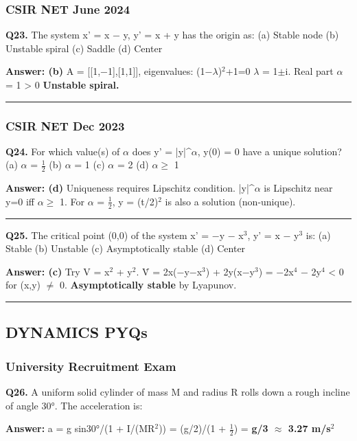 \documentclass[12pt,a4paper,openany]{book}
\begin{document}
{{\subsubsection{CSIR NET June 2024}
\textbf{Q23.} The system x' = x − y, y' = x + y has the origin as:
(a) Stable node  (b) Unstable spiral  (c) Saddle  (d) Center

\textbf{Answer: (b)} A = [[1,−1],[1,1]], eigenvalues: (1−$\lambda$)$^2$+1=0  $\lambda$ = 1$\pm$i. Real part $\alpha$ = 1 > 0  \textbf{Unstable spiral.}

\bigskip\noindent\rule{\textwidth}{0.4pt}\bigskip

\subsubsection{CSIR NET Dec 2023}
\textbf{Q24.} For which value(s) of $\alpha$ does y' = |y|^$\alpha$, y(0) = 0 have a unique solution?
(a) $\alpha$ = $\frac{1}{2}$  (b) $\alpha$ = 1  (c) $\alpha$ = 2  (d) $\alpha\geq$ 1

\textbf{Answer: (d)} Uniqueness requires Lipschitz condition. |y|^$\alpha$ is Lipschitz near y=0 iff $\alpha\geq$ 1. For $\alpha$ = $\frac{1}{2}$, y = (t/2)$^2$ is also a solution (non-unique).

\bigskip\noindent\rule{\textwidth}{0.4pt}\bigskip

\textbf{Q25.} The critical point (0,0) of the system x' = −y − x$^3$, y' = x − y$^3$ is:
(a) Stable  (b) Unstable  (c) Asymptotically stable  (d) Center

\textbf{Answer: (c)} Try V = x$^2$ + y$^2$. V̇ = 2x(−y−x$^3$) + 2y(x−y$^3$) = −2x$^4$ − 2y$^4$ < 0 for (x,y) $\neq$ 0. \textbf{Asymptotically stable} by Lyapunov.

\bigskip\noindent\rule{\textwidth}{0.4pt}\bigskip

\subsection{ DYNAMICS PYQs}

\subsubsection{University Recruitment Exam}
\textbf{Q26.} A uniform solid cylinder of mass M and radius R rolls down a rough incline of angle 30°. The acceleration is:

\textbf{Answer:} a = g sin30°/(1 + I/(MR$^2$)) = (g/2)/(1 + $\frac{1}{2}$) = \textbf{g/3 $\approx$ 3.27 m/s$^2$}

}}
\end{document}
